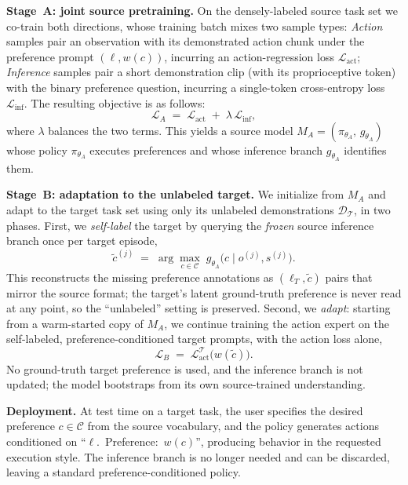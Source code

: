 \documentclass{article}
\begin{document}
\textbf{Stage~A: joint source pretraining.}
On the densely-labeled source task set we co-train both directions, whose training batch mixes two sample types:
\emph{Action} samples pair an observation with its demonstrated action chunk under the preference prompt $(\ell, w(c))$, incurring an action-regression loss $\mathcal{L}_{\mathrm{act}}$;
\emph{Inference} samples pair a short demonstration clip (with its proprioceptive token) with the binary preference question, incurring a single-token cross-entropy loss $\mathcal{L}_{\mathrm{inf}}$. 
The resulting objective is as follows:
\begin{equation}
  \mathcal{L}_{A} \;=\; \mathcal{L}_{\mathrm{act}} \;+\; \lambda\,\mathcal{L}_{\mathrm{inf}},
  \label{eq:stageA}
\end{equation}
where $\lambda$ balances the two terms. This yields a source model $M_A=(\pi_{\theta_A},\,g_{\theta_A})$ whose policy $\pi_{\theta_A}$ executes preferences and whose inference branch $g_{\theta_A}$ identifies them.

\textbf{Stage~B: adaptation to the unlabeled target.}
We initialize from $M_A$ and adapt to the target task set using only its unlabeled demonstrations $\mathcal{D}_{\mathcal{T}}$, in two phases.
First, we \emph{self-label} the target by querying the \emph{frozen} source inference branch once per target episode,
\begin{equation}
  \tilde{c}^{(j)} \;=\; \arg\max_{c\in\mathcal{C}}\; g_{\theta_A}\!\big(c \mid o^{(j)},s^{(j)}\big).
  \label{eq:pseudolabel}
\end{equation}
This reconstructs the missing preference annotations as $(\ell_T,\tilde{c})$ pairs
that mirror the source format; the target's latent ground-truth preference is
never read at any point, so the ``unlabeled'' setting is preserved.
Second, we \emph{adapt}: starting from a warm-started copy of $M_A$, we continue
training the action expert on the self-labeled, preference-conditioned target
prompts, with the action loss alone,
\begin{equation}
  \mathcal{L}_{B} \;=\; \mathcal{L}^{\mathcal{T}}_{\mathrm{act}}\!\big(w(\tilde{c})\big).
  \label{eq:stageB}
\end{equation}
No ground-truth target preference is used, and the inference branch is not
  updated; the model bootstraps from its own source-trained understanding.

\textbf{Deployment.}
At test time on a target task, the user specifies the desired preference
$c\in\mathcal{C}$ from the source vocabulary, and the policy generates actions
conditioned on ``$\ell$.~Preference:~$w(c)$'', producing behavior in the
requested execution style. The inference branch is no longer needed and can be
discarded, leaving a standard preference-conditioned policy.
\end{document}
